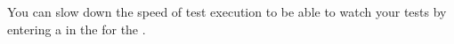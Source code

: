 
You can slow down the speed of test execution to be able to watch your tests by 
entering a  in the \gdpropview{} for the \gdsuite{} . 
